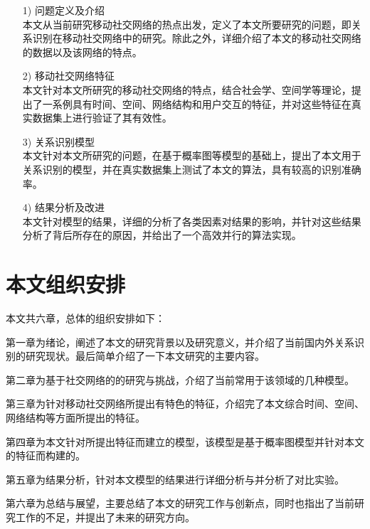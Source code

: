 \begin{enumerate}
\item[1)]问题定义及介绍 \\
本文从当前研究移动社交网络的热点出发，定义了本文所要研究的问题，即关系识别在移动社交网络中的研究。除此之外，详细介绍了本文的移动社交网络的数据以及该网络的特点。

\item[2)] 移动社交网络特征 \\
本文针对本文所研究的移动社交网络的特点，结合社会学、空间学等理论，提出了一系例具有时间、空间、网络结构和用户交互的特征，并对这些特征在真实数据集上进行验证了其有效性。

\item[3)] 关系识别模型 \\
本文针对本文所研究的问题，在基于概率图等模型的基础上，提出了本文用于关系识别的模型，并在真实数据集上测试了本文的算法，具有较高的识别准确率。

\item[4)] 结果分析及改进 \\
本文针对模型的结果，详细的分析了各类因素对结果的影响，并针对这些结果分析了背后所存在的原因，并给出了一个高效并行的算法实现。
\end{enumerate}



\section{本文组织安排}

本文共六章，总体的组织安排如下：

第一章为绪论，阐述了本文的研究背景以及研究意义，并介绍了当前国内外关系识别的研究现状。最后简单介绍了一下本文研究的主要内容。

第二章为基于社交网络的的研究与挑战，介绍了当前常用于该领域的几种模型。

第三章为针对移动社交网络所提出有特色的特征，介绍完了本文综合时间、空间、网络结构等方面所提出的特征。

第四章为本文针对所提出特征而建立的模型，该模型是基于概率图模型并针对本文的特征而构建的。

第五章为结果分析，针对本文模型的结果进行详细分析与并分析了对比实验。

第六章为总结与展望，主要总结了本文的研究工作与创新点，同时也指出了当前研究工作的不足，并提出了未来的研究方向。











